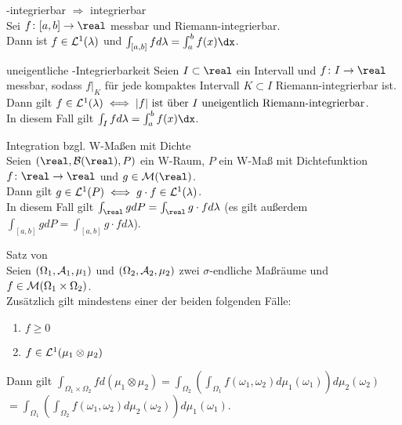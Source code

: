 \begin{Satz}{-integrierbar $\Rightarrow$ integrierbar}\\
    Sei $f\colon [a, b] \rightarrow \real$ messbar und Riemann-integrierbar.\\
    Dann ist $f \in \mathcal{L}^1(\lambda)$ und $\int_{[a, b]} f d\lambda = \int_a^b f(x)\dx$.
\end{Satz}

\begin{Satz}{uneigentliche -Integrierbarkeit}
    Seien $I \subset \real$ ein Intervall und $f\colon I \rightarrow \real$ messbar,
    sodass $f|_K$ für jede kompaktes Intervall $K \subset I$ Riemann-integrierbar ist.\\
    Dann gilt $f \in \mathcal{L}^1(\lambda) \iff
    |f| \text{ ist über } I \text{ uneigentlich Riemann-integrierbar}$.\\
    In diesem Fall gilt $\int_I f d\lambda = \int_a^b f(x)\dx$.
\end{Satz}

\begin{Satz}{Integration bzgl. W-Maßen mit Dichte}\\
    Seien $(\real, \B(\real), P)$ ein W-Raum,
    $P$ ein W-Maß mit Dichtefunktion $f\colon \real \rightarrow \real$ und $g \in \M(\real)$.\\
    Dann gilt $g \in \mathcal{L}^1(P) \iff g \cdot f \in \mathcal{L}^1(\lambda)$.\\
    In diesem Fall gilt $\int_\real g dP = \int_\real g \cdot f d\lambda$
    (es gilt außerdem $\int_{[a, b]} g dP = \int_{[a, b]} g \cdot f d\lambda$).
\end{Satz}

\begin{Satz}{Satz von \upshape{}}\\
    Seien $(\Omega_1, \mathcal{A}_1, \mu_1)$ und $(\Omega_2, \mathcal{A}_2, \mu_2)$ zwei $\sigma$-endliche Maßräume
    und $f \in \mathcal{M}(\Omega_1 \times \Omega_2)$.\\
    Zusätzlich gilt mindestens einer der beiden folgenden Fälle:
    \begin{enumerate}[label=(\roman*)]
        \item
        $f \ge 0$
        
        \item
        $f \in \mathcal{L}^1(\mu_1 \otimes \mu_2)$
    \end{enumerate}
    Dann gilt
    $\int_{\Omega_1 \times \Omega_2} f d(\mu_1 \otimes \mu_2)
    = \int_{\Omega_2} \left(\int_{\Omega_1} f(\omega_1, \omega_2)
    d\mu_1(\omega_1)\right) d\mu_2(\omega_2)$\\
    $= \int_{\Omega_1} \left(\int_{\Omega_2} f(\omega_1, \omega_2)
    d\mu_2(\omega_2)\right) d\mu_1(\omega_1)$.
\end{Satz}

